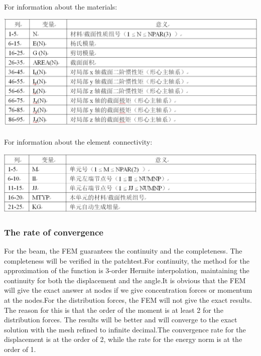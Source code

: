 \documentclass[UTF8]{ctexbook}
\begin{document}
\paragraph{}For information about the materials:
\begin{center}
\includegraphics[width=1.0\textwidth]{beam5.png}
\end{center}
\paragraph{}For information about the element connectivity:
\begin{center}
\includegraphics[width=1.0\textwidth]{beam6.png}
\end{center}
\subsubsection{The rate of convergence}
For the beam, the FEM guarantees the continuity and the completeness. The completeness will be verified in the patchtest.For continuity, the method for the approximation of the function is 3-order Hermite interpolation, maintaining the continuity for both the displacement and the angle.It is obvious that the FEM will give the exact answer at nodes if we give concentration forces or momentum at the nodes.For the distribution forces, the FEM will not give the exact results. The reason for this is that the order of the moment is at least 2 for the distribution forces. The results will be better and will converge to the exact solution with the mesh refined to infinite decimal.The convergence rate for the displacement is at the order of 2, while the rate for the energy norm is at the order of 1.
\end{document}
